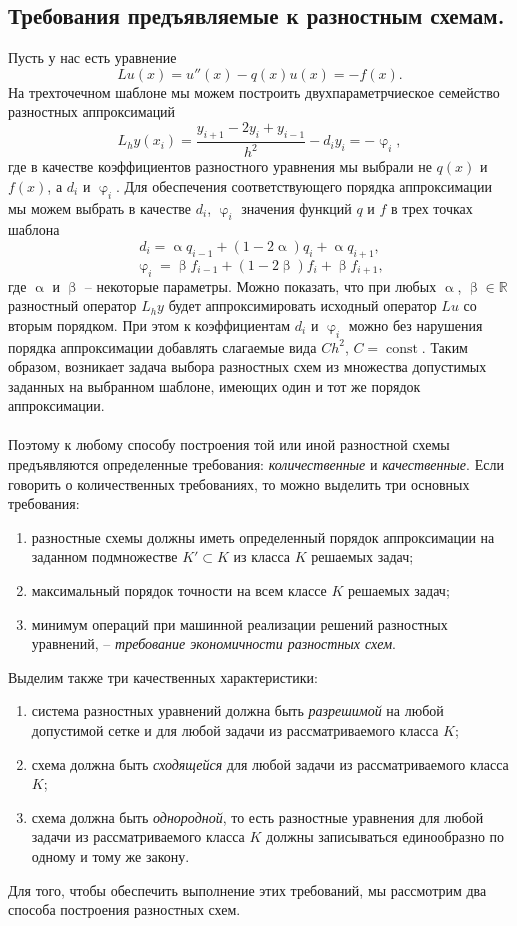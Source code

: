 \documentclass[a4paper, 12pt]{report}
\numberwithin{equation}{section}
\renewcommand{\alpha}{\upalpha}
\renewcommand{\beta}{\upbeta}
\renewcommand{\varphi}{\upvarphi}
\newcommand{\const}{\operatorname{const}}
\begin{document}
	\subsection{Требования предъявляемые к разностным схемам.}
	Пусть у нас есть уравнение
	$$Lu(x) = u''(x) - q(x) u(x) = -f(x).$$
	На трехточечном шаблоне мы можем построить двухпараметрчиеское семейство разностных аппроксимаций
	$$L_hy(x_i) = \dfrac{y_{i+1} - 2y_i + y_{i-1}}{h^2} - d_iy_i = -\varphi_i,$$
	где в качестве коэффициентов разностного уравнения мы выбрали не $q(x)$ и $f(x)$, а $d_i$ и $\varphi_i$.
	Для обеспечения соответствующего порядка аппроксимации мы можем выбрать в качестве $d_i$, $\varphi_i$ значения функций $q$ и $f$ в трех точках шаблона
	$$d_i = \alpha q_{i-1} + (1-2\alpha)q_i + \alpha q_{i+1},$$
	$$\varphi_i = \beta f_{i-1} + (1-2\beta)f_i + \beta f_{i+1},$$
	где $\alpha$ и $\beta$ -- некоторые параметры.
	Можно показать, что при любых $\alpha$, $\beta\in \mathbb R$ разностный оператор $L_hy$ будет аппроксимировать исходный оператор $Lu$ со вторым порядком. При этом к коэффициентам $d_i$ и $\varphi_i$ можно без нарушения порядка аппроксимации добавлять слагаемые вида $Ch^2$, $C = \const$. Таким образом, возникает задача выбора разностных схем из множества допустимых заданных на выбранном шаблоне, имеющих один и тот же порядок аппроксимации.\\\\
	Поэтому к любому способу построения той или иной разностной схемы предъявляются определенные требования: \textit{количественные} и \textit{качественные}. Если говорить о количественных требованиях, то можно выделить три основных требования:
		\begin{enumerate}
			\item разностные схемы должны иметь определенный порядок аппроксимации на заданном подмножестве $K' \subset K$ из класса $K$ решаемых задач;
			\item максимальный порядок точности на всем классе $K$ решаемых задач;
			\item минимум операций при машинной реализации решений разностных уравнений, -- \textit{требование экономичности разностных схем}.
		\end{enumerate}
		Выделим также три качественных характеристики:
		\begin{enumerate}
			\item система разностных уравнений должна быть \textit{разрешимой} на любой допустимой сетке и для любой задачи из рассматриваемого класса $K$;
			\item схема должна быть \textit{сходящейся} для любой задачи из рассматриваемого класса $K$;
			\item схема должна быть \textit{однородной}, то есть разностные уравнения для любой задачи из рассматриваемого класса $K$ должны записываться единообразно по одному и тому же закону.
		\end{enumerate}
		Для того, чтобы обеспечить выполнение этих требований, мы рассмотрим два способа построения разностных схем. 
\end{document}

